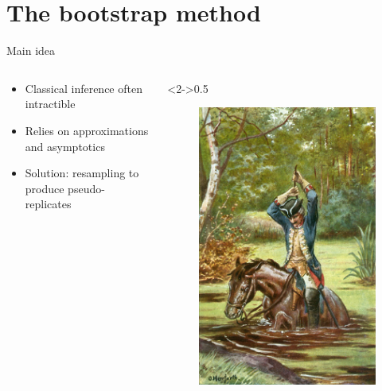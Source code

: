\documentclass[tikz]{beamer}
\begin{document}
\section{The bootstrap method}

\begin{frame}{Main idea}
  \begin{columns}
    \begin{column}{0.5\linewidth}
      \begin{itemize}
        \item Classical inference often intractible
        \item Relies on approximations and asymptotics
        \item Solution: resampling to produce pseudo-replicates
      \end{itemize}
    \end{column}
    \begin{column}<2->{0.5\linewidth}
      \begin{figure}
        \includegraphics{munchausen.jpg}
      \end{figure}
    \end{column}
  \end{columns}
\end{frame}
\end{document}
